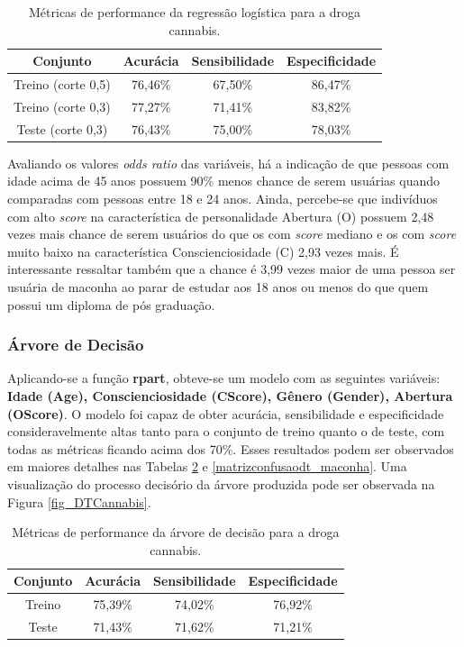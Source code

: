 \documentclass[
	article,			%
	11pt,				%
	oneside,			%
	a4paper,			%
	english,			%
	brazil,				%
	sumario=tradicional
	]{abntex2}
\begin{document}
\begin{table}[H]
\centering
\begin{tabular}{||c|c|c|c||}
\hline
Conjunto & Acurácia & Sensibilidade & Especificidade \\ \hline
Treino (corte 0,5) & 76,46\% & 67,50\% & 86,47\% \\ \hline
Treino (corte 0,3) & 77,27\% & 71,41\% & 83,82\% \\ \hline
Teste (corte 0,3) & 76,43\% & 75,00\% & 78,03\% \\ \hline
\end{tabular}
\caption{Métricas de performance da regressão logística para a droga cannabis.}
\label{resultadosreglog_maconha}
\end{table}

Avaliando os valores \emph{odds ratio} das variáveis, há a indicação de que pessoas com idade acima de 45 anos possuem 90\% menos chance de serem usuárias quando comparadas com pessoas entre 18 e 24 anos. Ainda, percebe-se que indivíduos com alto \emph{score} na característica de personalidade Abertura (O) possuem 2,48 vezes mais chance de serem usuários do que os com \emph{score} mediano e os com \emph{score} muito baixo na característica Conscienciosidade (C) 2,93 vezes mais. É interessante ressaltar também que a chance é 3,99 vezes maior de uma pessoa ser usuária de maconha ao parar de estudar aos 18 anos ou menos do que quem possui um diploma de pós graduação.

\subsubsection{Árvore de Decisão}

Aplicando-se a função \textbf{rpart}, obteve-se um modelo com as seguintes variáveis: \textbf{Idade (Age), Conscienciosidade (CScore), Gênero (Gender), Abertura (OScore)}. O modelo foi capaz de obter acurácia, sensibilidade e especificidade consideravelmente altas tanto para o conjunto de treino quanto o de teste, com todas as métricas ficando acima dos 70\%. Esses resultados podem ser observados em maiores detalhes nas Tabelas \ref{resultadosdt_maconha} e \ref{matrizconfusaodt_maconha}. Uma visualização do processo decisório da árvore produzida pode ser observada na Figura \ref{fig_DTCannabis}.

\begin{table}[H]
\centering
\begin{tabular}{||c|c|c|c||}
\hline
Conjunto & Acurácia & Sensibilidade & Especificidade \\ \hline
Treino & 75,39\% & 74,02\% & 76,92\% \\ \hline
Teste & 71,43\% & 71,62\% & 71,21\% \\ \hline
\end{tabular}
\caption{Métricas de performance da árvore de decisão para a droga cannabis.}
\label{resultadosdt_maconha}
\end{table}
\end{document}
